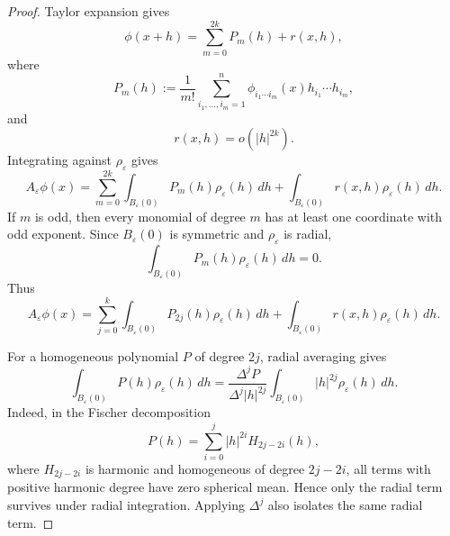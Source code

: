 \documentclass[12pt,reqno]{amsart}
\numberwithin{equation}{section}
\theoremstyle{plain}
\theoremstyle{definition}
\theoremstyle{remark}
\newcommand{\rhoeps}{\rho_\varepsilon}
\begin{document}
\begin{proof}
Taylor expansion gives
\[
  \phi(x+h)
  =
  \sum_{m=0}^{2k}P_m(h)+r(x,h),
\]
where
\[
  P_m(h)
  :=
  \frac1{m!}
  \sum_{i_1,\dots,i_m=1}^{n}
  \phi_{i_1\cdots i_m}(x)
  h_{i_1}\cdots h_{i_m},
\]
and
\[
  r(x,h)=o(|h|^{2k}).
\]
Integrating against $\rhoeps$ gives
\[
  A_\varepsilon\phi(x)
  =
  \sum_{m=0}^{2k}
  \int_{B_\varepsilon(0)}P_m(h)\rhoeps(h)\,dh
  +
  \int_{B_\varepsilon(0)}r(x,h)\rhoeps(h)\,dh.
\]
If $m$ is odd, then every monomial of degree $m$ has at least one
coordinate with odd exponent. Since $B_\varepsilon(0)$ is symmetric and
$\rhoeps$ is radial,
\[
  \int_{B_\varepsilon(0)}P_m(h)\rhoeps(h)\,dh=0.
\]
Thus
\[
  A_\varepsilon\phi(x)
  =
  \sum_{j=0}^{k}
  \int_{B_\varepsilon(0)}P_{2j}(h)\rhoeps(h)\,dh
  +
  \int_{B_\varepsilon(0)}r(x,h)\rhoeps(h)\,dh.
\]

For a homogeneous polynomial $P$ of degree $2j$, radial averaging gives
\begin{equation}\label{eq:radial-average}
  \int_{B_\varepsilon(0)}P(h)\rhoeps(h)\,dh
  =
  \frac{\Delta^jP}{\Delta^j|h|^{2j}}
  \int_{B_\varepsilon(0)}|h|^{2j}\rhoeps(h)\,dh.
\end{equation}
Indeed, in the Fischer decomposition
\[
  P(h)=\sum_{i=0}^{j}|h|^{2i}H_{2j-2i}(h),
\]
where $H_{2j-2i}$ is harmonic and homogeneous of degree $2j-2i$, all
terms with positive harmonic degree have zero spherical mean. Hence only
the radial term survives under radial integration. Applying $\Delta^j$
also isolates the same radial term.


\end{proof}
\end{document}
